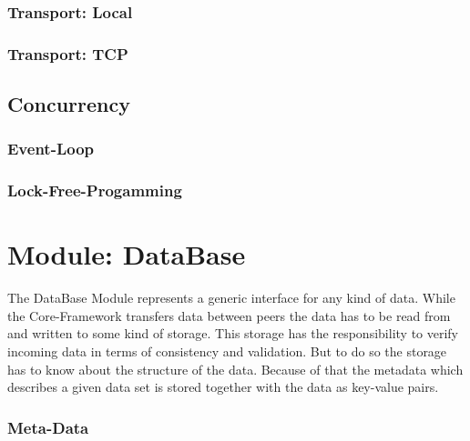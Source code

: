\subsubsection{Transport: Local}
\subsubsection{Transport: TCP}
\subsection{Concurrency}
\subsubsection{Event-Loop}
\subsubsection{Lock-Free-Progamming}
\section{Module: DataBase}
\label{sec:database}

The DataBase Module represents a generic interface for any kind of data. While the Core-Framework transfers data between peers the data has to be read from and written to some kind of storage. This storage has the responsibility to verify incoming data in terms of consistency and validation. But to do so the storage has to know about the structure of the data. Because of that the metadata which describes a given data set is stored together with the data as key-value pairs.

\subsubsection{Meta-Data}
\label{subsubsec:metadata}

